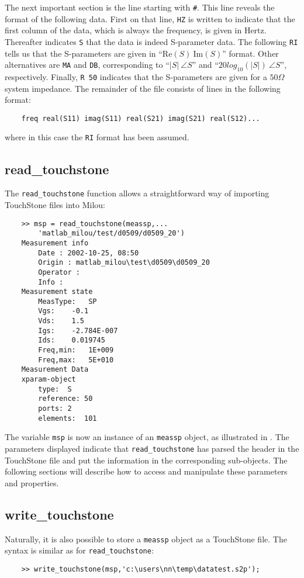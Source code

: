 The next important section is the line starting with \verb"#".
This line reveals the format of the following data. First on that
line, \verb"HZ" is written to indicate that the first column of
the data, which is always the frequency, is given in Hertz.
Thereafter indicates \verb"S" that the data is indeed S-parameter
data. The following \verb"RI" tells us that the S-parameters are
given in ``$\mathrm{Re}(S)~\mathrm{Im}(S)$'' format. Other
alternatives are \verb"MA" and \verb"DB", corresponding to
``$|S|~\angle S$'' and ``$20 log_{10}(|S|)~\angle S$'',
respectively. Finally, \verb"R 50" indicates that the S-parameters
are given for a $50 \Omega$ system impedance. The remainder of the
file consists of lines in the following format:
\begin{small}
\begin{verbatim}
    freq real(S11) imag(S11) real(S21) imag(S21) real(S12)...
\end{verbatim}
\end{small}
where in this case the \verb"RI" format has been assumed.

\subsection{read\_touchstone}
The \verb"read_touchstone" function allows a straightforward way
of importing TouchStone files into Milou:

\begin{small}
\begin{verbatim}
    >> msp = read_touchstone(meassp,...
        'matlab_milou/test/d0509/d0509_20')
    Measurement info
        Date : 2002-10-25, 08:50
        Origin : matlab_milou\test\d0509\d0509_20
        Operator :
        Info :
    Measurement state
        MeasType:   SP
        Vgs:    -0.1
        Vds:    1.5
        Igs:    -2.784E-007
        Ids:    0.019745
        Freq,min:   1E+009
        Freq,max:   5E+010
    Measurement Data
    xparam-object
        type:  S
        reference: 50
        ports: 2
        elements:  101
\end{verbatim}
\end{small}

The variable \verb"msp" is now an instance of an \verb"meassp"
object, as illustrated in . The parameters
displayed indicate that \verb"read_touchstone" has parsed the
header in the TouchStone file and put the information in the
corresponding sub-objects. The following sections will describe
how to access and manipulate these parameters and properties.

\subsection{write\_touchstone}
Naturally, it is also possible to store a \verb"meassp" object as
a TouchStone file. The syntax is similar as for
\verb"read_touchstone":
\begin{small}
\begin{verbatim}
    >> write_touchstone(msp,'c:\users\nn\temp\datatest.s2p');
\end{verbatim}
\end{small}

